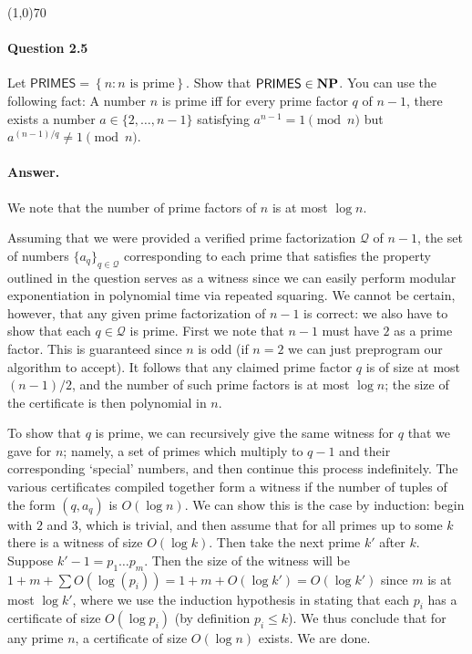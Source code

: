\begin{center}
	\line(1,0){70}
\end{center}

\paragraph{Question 2.5} Let $\mathsf{PRIMES}=\left\{n:n\text{ is prime}\right\}$. Show that $\mathsf{PRIMES}\in\mathbf{NP}$. You can use the following fact: A number $n$ is prime iff for every prime factor $q$ of $n-1$, there exists a number $a\in\{2,\dots,n-1\}$ satisfying $a^{n-1}=1\pmod{n}$ but $a^{(n-1)/q}\neq 1\pmod n$.

\paragraph{Answer.} We note that the number of prime factors of $n$ is at most $\log n$. 

Assuming that we were provided a verified prime factorization $\mathcal{Q}$ of $n-1$, the set of numbers $\{a_q\}_{q\in\mathcal{Q}}$ corresponding to each prime that satisfies the property outlined in the question serves as a witness since we can easily perform modular exponentiation in polynomial time via repeated squaring. We cannot be certain, however, that any given prime factorization of $n-1$ is correct: we also have to show that each $q\in\mathcal{Q}$ is prime. First we note that $n-1$ must have $2$ as a prime factor. This is guaranteed since $n$ is odd (if $n=2$ we can just preprogram our algorithm to accept). It follows that any claimed prime factor $q$ is of size at most $(n-1)/2$, and the number of such prime factors is at most $\log n$; the size of the certificate is then polynomial in $n$.

To show that $q$ is prime, we can recursively give the same witness for $q$ that we gave for $n$; namely, a set of primes which multiply to $q-1$ and their corresponding `special' numbers, and then continue this process indefinitely. The various certificates compiled together form a witness if the number of tuples of the form $(q, a_q)$ is $O(\log n)$. We can show this is the case by induction: begin with $2$ and $3$, which is trivial, and then assume that for all primes up to some $k$ there is a witness of size $O(\log k)$. Then take the next prime $k'$ after $k$. Suppose $k'-1=p_1\dots p_m$. Then the size of the witness will be $1+m+\sum O(\log(p_i))=1+m+O(\log k')=O(\log k')$ since $m$ is at most $\log k'$, where we use the induction hypothesis in stating that each $p_i$ has a certificate of size $O(\log p_i)$ (by definition $p_i\leq k$). We thus conclude that for any prime $n$, a certificate of size $O(\log n)$ exists. We are done.

